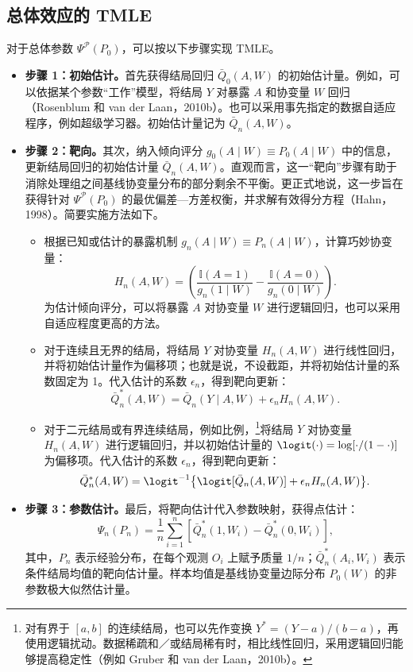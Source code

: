 \subsection{总体效应的 TMLE}

对于总体参数 $\Psi^{\mathcal P}(P_0)$，可以按以下步骤实现 TMLE。

\begin{itemize}
\item \textbf{步骤 1：初始估计。}首先获得结局回归 $\bar Q_0(A,W)$ 的初始估计量。例如，可以依据某个参数“工作”模型，将结局 $Y$ 对暴露 $A$ 和协变量 $W$ 回归（Rosenblum 和 van der Laan，2010b）。也可以采用事先指定的数据自适应程序，例如超级学习器。初始估计量记为 $\bar Q_n(A,W)$。

\item \textbf{步骤 2：靶向。}其次，纳入倾向评分 $g_0(A\mid W)\equiv P_0(A\mid W)$ 中的信息，更新结局回归的初始估计量 $\bar Q_n(A,W)$。直观而言，这一“靶向”步骤有助于消除处理组之间基线协变量分布的部分剩余不平衡。更正式地说，这一步旨在获得针对 $\Psi^{\mathcal P}(P_0)$ 的最优偏差—方差权衡，并求解有效得分方程（Hahn，1998）。简要实施方法如下。
\begin{itemize}[label=--]
\item 根据已知或估计的暴露机制 $g_n(A\mid W)\equiv P_n(A\mid W)$，计算巧妙协变量：
\[
H_n(A,W)=\left(\frac{\mathbb I(A=1)}{g_n(1\mid W)}
-\frac{\mathbb I(A=0)}{g_n(0\mid W)}\right).
\]
为估计倾向评分，可以将暴露 $A$ 对协变量 $W$ 进行逻辑回归，也可以采用自适应程度更高的方法。

\item 对于连续且无界的结局，将结局 $Y$ 对协变量 $H_n(A,W)$ 进行线性回归，并将初始估计量作为偏移项；也就是说，不设截距，并将初始估计量的系数固定为 1。代入估计的系数 $\epsilon_n$，得到靶向更新：
\[
\bar Q_n^*(A,W)=\bar Q_n(Y\mid A,W)+\epsilon_nH_n(A,W).
\]

\item 对于二元结局或有界连续结局，例如比例，\footnote{对有界于 $[a,b]$ 的连续结局，也可以先作变换 $Y^*=(Y-a)/(b-a)$，再使用逻辑扰动。数据稀疏和／或结局稀有时，相比线性回归，采用逻辑回归能够提高稳定性（例如 Gruber 和 van der Laan，2010b）。}将结局 $Y$ 对协变量 $H_n(A,W)$ 进行逻辑回归，并以初始估计量的 $\logit(\cdot)=\log[\cdot/(1-\cdot)]$ 为偏移项。代入估计的系数 $\epsilon_n$，得到靶向更新：
\[
\bar Q_n^*(A,W)=\logit^{-1}\bigl\{\logit[\bar Q_n(A,W)]+\epsilon_nH_n(A,W)\bigr\}.
\]
\end{itemize}

\item \textbf{步骤 3：参数估计。}最后，将靶向估计代入参数映射，获得点估计：
\[
\Psi_n(P_n)=\frac1n\sum_{i=1}^n[\bar Q_n^*(1,W_i)-\bar Q_n^*(0,W_i)],
\]
其中，$P_n$ 表示经验分布，在每个观测 $O_i$ 上赋予质量 $1/n$；$\bar Q_n^*(A_i,W_i)$ 表示条件结局均值的靶向估计量。样本均值是基线协变量边际分布 $P_0(W)$ 的非参数极大似然估计量。
\end{itemize}

